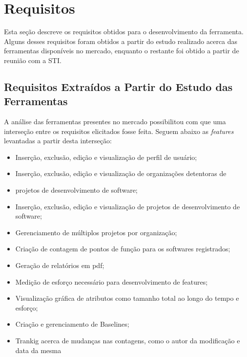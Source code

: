 \section{Requisitos}

Esta seção descreve os requisitos obtidos para o desenvolvimento da ferramenta. Alguns desses requisitos foram obtidos a partir do estudo realizado acerca das ferramentas disponíveis no mercado, enquanto o restante foi obtido a partir de reunião com a STI.

\subsection{Requisitos Extraídos a Partir do Estudo das Ferramentas}

A análise das ferramentas presentes no mercado possibilitou com que uma interseção entre os requisitos elicitados fosse feita. Seguem abaixo as \textit{features} levantadas a partir desta interseção:

\begin{itemize}

\item Inserção, exclusão, edição e visualização de perfil de usuário;

\item Inserção, exclusão, edição e visualização de organizações detentoras de

\item projetos de desenvolvimento de software;

\item Inserção, exclusão, edição e visualização de projetos de desenvolvimento de software;

\item Gerenciamento de múltiplos projetos por organização;

\item Criação de contagem de pontos de função para os softwares registrados;

\item Geração de relatórios em pdf;

\item Medição de esforço necessário para desenvolvimento de features;

\item Visualização gráfica de atributos como tamanho total ao longo do tempo e
esforço;

\item Criação e gerenciamento de Baselines;

\item Trankig acerca de mudanças nas contagens, como o autor da modificação e data da mesma

\end{itemize}

